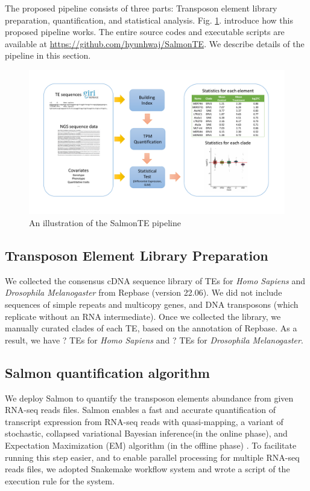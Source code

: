 \documentclass{ws-procs11x85}
\begin{document}
The proposed pipeline consists of three parts: Transposon element library preparation, quantification, and statistical analysis. Fig. \ref{aba:fig1}. introduce how this proposed pipeline works.
The entire source codes and executable scripts are available at \url{https://github.com/hyunhwaj/SalmonTE}. We describe details of the pipeline in this section. 

\begin{figure}[!ht]
\centerline{
\includegraphics[width=16cm]{fig1.pdf}
}
\caption{An illustration of the SalmonTE pipeline}
\label{aba:fig1}
\end{figure}

\subsection{Transposon Element Library Preparation}

We collected the consensus cDNA sequence library of TEs for \textit{Homo Sapiens} and \textit{Drosophila Melanogaster} from Repbase  
(version 22.06)\cite{repbase}. We did not include sequences of simple repeats and multicopy genes, and DNA transposons (which replicate without an RNA intermediate). Once we collected the library, we manually curated clades of each TE, based on the annotation of Repbase. As a result, we have ? TEs for \textit{Homo Sapiens} and ? TEs for \textit{Drosophila Melanogaster}.

\subsection{Salmon quantification algorithm}

We deploy Salmon\cite{patro2017salmon} to quantify the transposon elements abundance from given RNA-seq reads files. Salmon enables a fast and accurate quantification of transcript expression from RNA-seq reads with quasi-mapping, a variant of stochastic, collapsed variational Bayesian inference(in the online phase), and Expectation Maximization (EM) algorithm (in the offline phase)
\cite{patro2017salmon,srivastava2016rapmap,bishop2006pattern,foulds2013stochastic}. 
To facilitate running this step easier, and to enable parallel processing for multiple RNA-seq reads files, we adopted Snakemake workflow system and wrote a script of the execution rule for the system.\cite{koster2012snakemake}
\end{document}
